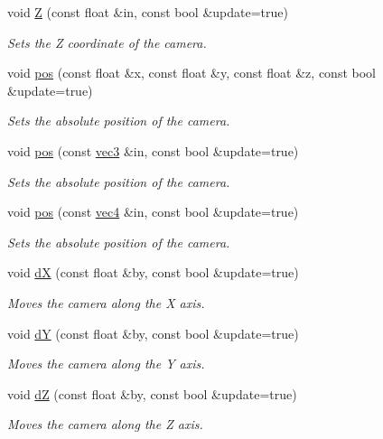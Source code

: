 \begin{DoxyCompactItemize}
void \hyperlink{class_camera_a38438f8e2417a3a40eaad85d2ab344a9}{Z} (const float \&in, const bool \&update=true)
\begin{DoxyCompactList}\small\item\em Sets the Z coordinate of the camera. \end{DoxyCompactList}\item 
void \hyperlink{class_camera_a432e03c15d63f8839fe4731016d907a4}{pos} (const float \&x, const float \&y, const float \&z, const bool \&update=true)
\begin{DoxyCompactList}\small\item\em Sets the absolute position of the camera. \end{DoxyCompactList}\item 
void \hyperlink{class_camera_ae9dc2206b71b25cf320a05d148cb8b56}{pos} (const \hyperlink{struct_angel_1_1vec3}{vec3} \&in, const bool \&update=true)
\begin{DoxyCompactList}\small\item\em Sets the absolute position of the camera. \end{DoxyCompactList}\item 
void \hyperlink{class_camera_aec2115038562e514193bb2b67f5da153}{pos} (const \hyperlink{struct_angel_1_1vec4}{vec4} \&in, const bool \&update=true)
\begin{DoxyCompactList}\small\item\em Sets the absolute position of the camera. \end{DoxyCompactList}\item 
void \hyperlink{class_camera_ac7985a6cb48f4e1e74fda17e5213dd74}{d\-X} (const float \&by, const bool \&update=true)
\begin{DoxyCompactList}\small\item\em Moves the camera along the X axis. \end{DoxyCompactList}\item 
void \hyperlink{class_camera_a59570a88e3ff2d277c9e995372fcadfe}{d\-Y} (const float \&by, const bool \&update=true)
\begin{DoxyCompactList}\small\item\em Moves the camera along the Y axis. \end{DoxyCompactList}\item 
void \hyperlink{class_camera_ab94ed9b3c7e12f484d6bfa5f827b59ff}{d\-Z} (const float \&by, const bool \&update=true)
\begin{DoxyCompactList}\small\item\em Moves the camera along the Z axis. \end{DoxyCompactList}\item 

\end{DoxyCompactItemize}

